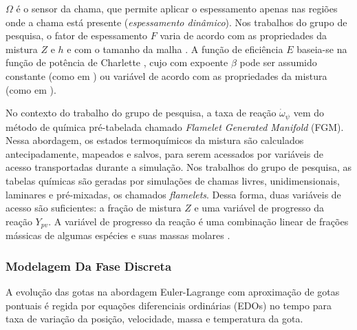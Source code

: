 $\Omega$ é o sensor da chama, que permite aplicar o espessamento apenas nas regiões onde a chama está presente (\emph{espessamento dinâmico}).
Nos trabalhos do grupo de pesquisa, o fator de espessamento $F$ varia de acordo com as propriedades da mistura $Z$ e $h$ e com o tamanho da malha \cite{SacomanoF2017PhD,SacomanoF2017CF}.
A função de eficiência $E$ baseia-se na função de potência de Charlette \cite{CharletteF2002}, cujo com expoente $\beta$ pode ser assumido constante (como em \cite{SacomanoF2017PhD,SacomanoF2017CF,SacomanoF2019IJHMT,ShastryV2023,SekularacN2024}) ou variável de acordo com as propriedades da mistura (como em \cite{SacomanoF2020CF}).

No contexto do trabalho do grupo de pesquisa, a taxa de reação $\dot \omega_\psi$ vem do método de química pré-tabelada chamado \emph{Flamelet Generated Manifold} (FGM).
Nessa abordagem, os estados termoquímicos da mistura são calculados antecipadamente, mapeados e salvos, para serem acessados por variáveis de acesso transportadas durante a simulação.
Nos trabalhos do grupo de pesquisa, as tabelas químicas são geradas por simulações de chamas livres, unidimensionais, laminares e pré-mixadas, os chamados \emph{flamelets}.
Dessa forma, duas variáveis de acesso são suficientes: a fração de mistura $Z$ e uma variável de progresso da reação $Y_{pv}$.
A variável de progresso da reação é uma combinação linear de frações mássicas de algumas espécies e suas massas molares \cite{SacomanoF2018CTM}.





    
    

\subsubsection{Modelagem Da Fase Discreta} \label{sec:gotas}

A evolução das gotas na abordagem Euler-Lagrange com aproximação de gotas pontuais é regida por equações diferenciais ordinárias (EDOs) no tempo para taxa de variação da posição, velocidade, massa e temperatura da gota.

